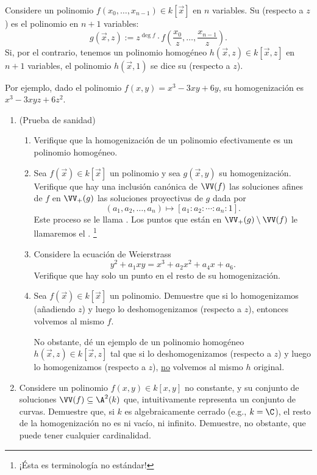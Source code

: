 \documentclass[11pt, reqno]{amsart}
\begin{document}
\begin{mydef}
	Considere un polinomio $f(x_0, \dots, x_{n-1}) \in k[\vec x]$ en $n$ variables.
	Su  (respecto a $z$) es el polinomio en $n + 1$ variables:
	$$ g(\vec x, z) := z^{\deg f} \cdot f\left( \frac{x_0}{z}, \dots, \frac{x_{n-1}}{z} \right). $$
	Si, por el contrario, tenemos un polinomio homogéneo $h(\vec x, z) \in k[\vec x, z]$ en $n+1$ variables, el polinomio $h(\vec x, 1)$ se dice
	su  (respecto a $z$).
\end{mydef}
Por ejemplo, dado el polinomio $f(x, y) = x^3 - 3xy + 6y$, su homogenización es $x^3 - 3xyz + 6z^2$.

\begin{enumerate}[resume]
	\item (Prueba de sanidad)
		\begin{enumerate}
			\item Verifique que la homogenización de un polinomio efectivamente es un polinomio homogéneo.
			\item Sea $f(\vec x) \in k[\vec x]$ un polinomio y sea $g(\vec x, y)$ su homogenización.
				Verifique que hay una inclusión canónica de $\VV(f)$ las soluciones afines de $f$ en $\VV_+(g)$ las soluciones
				proyectivas de $g$ dada por
				\[
					(a_1, a_2, \dots, a_n) \longmapsto [a_1 : a_2 : \cdots : a_n : 1].
				\]
				Este proceso se le llama .
				Los puntos que están en $\VV_+(g) \setminus \VV(f)$ le llamaremos el .%
				\footnote{¡Ésta es terminología no estándar!}
			\item Considere la ecuación de Weierstrass
				$$ y^2 + a_1 xy = x^3 + a_2 x^2 + a_4 x + a_6. $$
				Verifique que hay solo un punto en el resto de su homogenización.
			\item Sea $f(\vec x) \in k[\vec x]$ un polinomio.
				Demuestre que si lo homogenizamos (añadiendo $z$) y luego lo deshomogenizamos (respecto a $z$), entonces volvemos al mismo $f$.

				No obstante, dé un ejemplo de un polinomio homogéneo $h(\vec x, z) \in k[\vec x, z]$ tal que si lo deshomogenizamos (respecto a $z$)
				y luego lo homogenizamos (respecto a $z$), \underline{no} volvemos al mismo $h$ original.
		\end{enumerate}

	\item Considere un polinomio $f(x, y) \in k[x, y]$ no constante, y su conjunto de soluciones $\VV(f) \subseteq \A^2(k)$ que, intuitivamente
		representa un conjunto de curvas.
		Demuestre que, si $k$ es algebraicamente cerrado (e.g., $k = \C$), el resto de la homogenización no es ni vacío, ni infinito.
		Demuestre, no obstante, que puede tener cualquier cardinalidad.

\end{enumerate}
\end{document}
